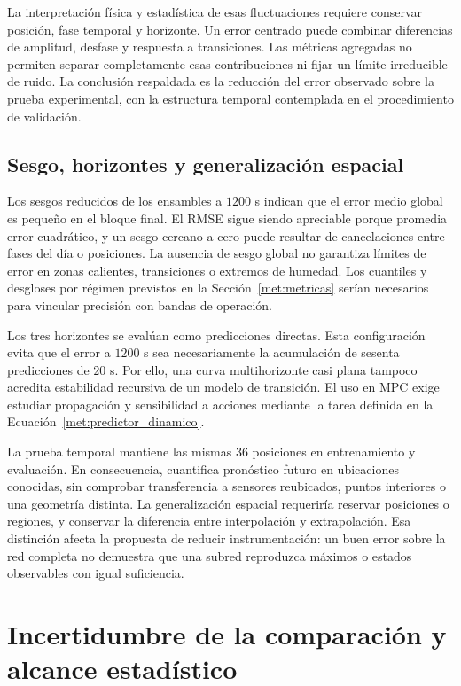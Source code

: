 La interpretación física y estadística de esas fluctuaciones requiere conservar posición, fase temporal y horizonte. Un error centrado puede combinar diferencias de amplitud, desfase y respuesta a transiciones. Las métricas agregadas no permiten separar completamente esas contribuciones ni fijar un límite irreducible de ruido. La conclusión respaldada es la reducción del error observado sobre la prueba experimental, con la estructura temporal contemplada en el procedimiento de validación.

\subsection{Sesgo, horizontes y generalización espacial}

Los sesgos reducidos de los ensambles a $1200$ s indican que el error medio global es pequeño en el bloque final. El RMSE sigue siendo apreciable porque promedia error cuadrático, y un sesgo cercano a cero puede resultar de cancelaciones entre fases del día o posiciones. La ausencia de sesgo global no garantiza límites de error en zonas calientes, transiciones o extremos de humedad. Los cuantiles y desgloses por régimen previstos en la Sección~\ref{met:metricas} serían necesarios para vincular precisión con bandas de operación.

Los tres horizontes se evalúan como predicciones directas. Esta configuración evita que el error a $1200$ s sea necesariamente la acumulación de sesenta predicciones de $20$ s. Por ello, una curva multihorizonte casi plana tampoco acredita estabilidad recursiva de un modelo de transición. El uso en MPC exige estudiar propagación y sensibilidad a acciones mediante la tarea definida en la Ecuación~\eqref{met:predictor_dinamico}.

La prueba temporal mantiene las mismas $36$ posiciones en entrenamiento y evaluación. En consecuencia, cuantifica pronóstico futuro en ubicaciones conocidas, sin comprobar transferencia a sensores reubicados, puntos interiores o una geometría distinta. La generalización espacial requeriría reservar posiciones o regiones, y conservar la diferencia entre interpolación y extrapolación. Esa distinción afecta la propuesta de reducir instrumentación: un buen error sobre la red completa no demuestra que una subred reproduzca máximos o estados observables con igual suficiencia.
\FloatBarrier

\section{Incertidumbre de la comparación y alcance estadístico}
\label{dis:estadistica}

